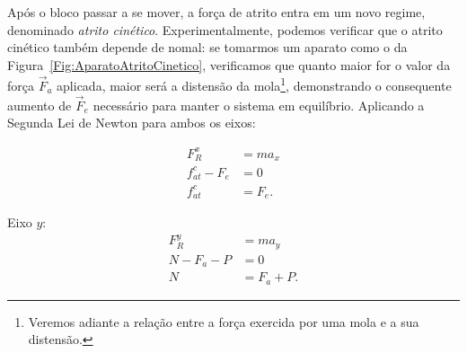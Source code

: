 Após o bloco passar a se mover, a força de atrito entra em um novo regime, denominado \emph{atrito cinético}. Experimentalmente, podemos verificar que o atrito cinético também depende de nomal: se tomarmos um aparato como o da Figura~\ref{Fig:AparatoAtritoCinetico}, verificamos que quanto maior for o valor da força $\vec{F}_a$ aplicada, maior será a distensão da mola\footnote{Veremos adiante a relação entre a força exercida por uma mola e a sua distensão.}, demonstrando o consequente aumento de $\vec{F}_e$ necessário para manter o sistema em equilíbrio. Aplicando a Segunda Lei de Newton para ambos os eixos:
\begin{description}
    \item[Eixo $x$:]
        \begin{align}
            F_R^x &= m a_x \\
            f_{at}^c - F_e &= 0 \\
            f_{at}^c &= F_e.
        \end{align}
    \item{Eixo $y$:}
        \begin{align}
            F_R^y &= m a_y \\
            N - F_a - P &= 0 \\
            N &= F_a + P.
        \end{align}
\end{description}
